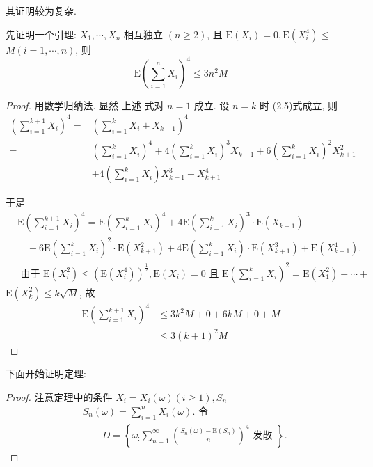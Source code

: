 其证明较为复杂. 

{
    \small
    先证明一个引理: 
         $X_1, \cdots, X_n$ 相互独立 $(n \geqslant 2)$, 且 $\mathrm{E}\left(X_i\right)=0, \mathrm{E}\left(X_i^4\right) \leq$ $M(i=1, \cdots, n)$, 则
$$
\mathrm{E}\left(\sum_{i=1}^n X_i\right)^4 \leq 3 n^2 M
$$
\begin{proof}
     用数学归纳法. 显然 上述 式对 $n=1$ 成立. 设 $n=k$ 时 (2.5)式成立, 则
$$
\begin{aligned}
\left(\sum_{i=1}^{k+1} X_i\right)^4= & \left(\sum_{i=1}^k X_i+X_{k+1}\right)^4 \\
= & \left(\sum_{i=1}^k X_i\right)^4+4\left(\sum_{i=1}^k X_i\right)^3 X_{k+1}+6\left(\sum_{i=1}^k X_i\right)^2 X_{k+1}^2 \\
& +4\left(\sum_{i=1}^k X_i\right) X_{k+1}^3+X_{k+1}^4
\end{aligned}
$$

于是
$$
\begin{aligned}
& \mathrm{E}\left(\sum_{i=1}^{k+1} X_i\right)^4=\mathrm{E}\left(\sum_{i=1}^k X_i\right)^4+4 \mathrm{E}\left(\sum_{i=1}^k X_i\right)^3 \cdot \mathrm{E}\left(X_{k+1}\right) \\
& \quad+6 \mathrm{E}\left(\sum_{i=1}^k X_i\right)^2 \cdot \mathrm{E}\left(X_{k+1}^2\right)+4 \mathrm{E}\left(\sum_{i=1}^k X_i\right) \cdot \mathrm{E}\left(X_{k+1}^3\right)+\mathrm{E}\left(X_{k+1}^4\right) . \\
& \text { 由于 } \mathrm{E}\left(X_i^2\right) \leq\left(\mathrm{E}\left(X_i^4\right)\right)^{\frac{1}{2}}, \mathrm{E}\left(X_i\right)=0 \text { 且 } \mathrm{E}\left(\sum_{i=1}^k X_i\right)^2=\mathrm{E}\left(X_1^2\right)+\cdots+
\end{aligned}
$$
$\mathrm{E}\left(X_k^2\right) \leq k \sqrt{M}$, 故
$$
\begin{aligned}
\mathrm{E}\left(\sum_{i=1}^{k+1} X_i\right)^4 & \leq 3 k^2 M+0+6 k M+0+M \\
& \leq 3(k+1)^2 M
\end{aligned}
$$
\end{proof}

下面开始证明定理: 
\begin{proof}
    注意定理中的条件 $X_i=X_i(\omega)(i \geqslant 1), S_n$
$$
\begin{aligned}
& S_n(\omega)=\sum_{i=1}^n X_i(\omega) \text {. 令 } \\
& \qquad D=\left\{\omega_{:} \sum_{n=1}^{\infty}\left(\frac{S_n(\omega)-\mathrm{E}\left(S_n\right)}{n}\right)^4 \text { 发散 }\right\} .
\end{aligned}
$$


\end{proof}}
